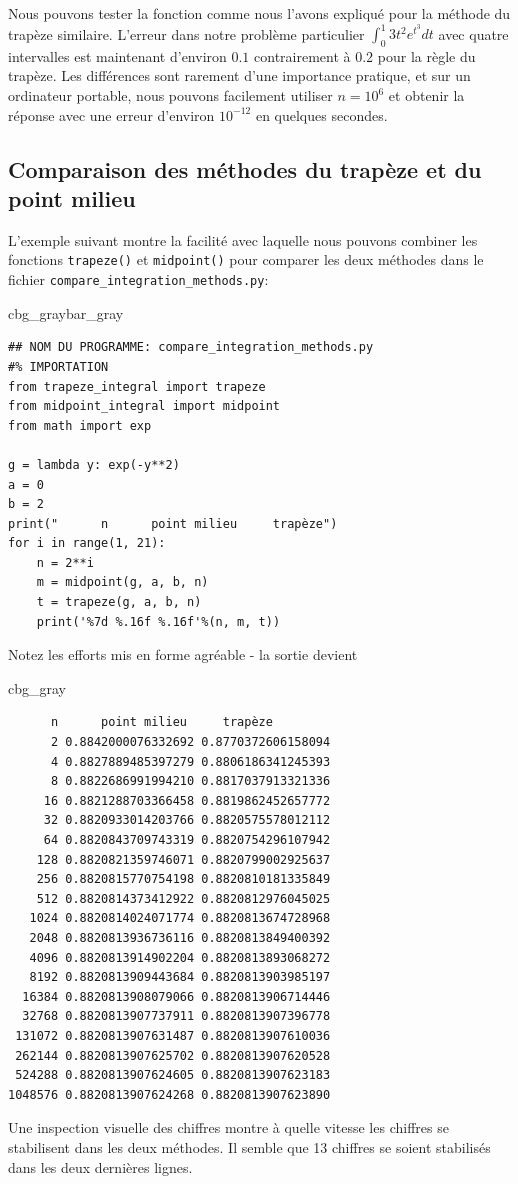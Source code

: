 \documentclass[%
oneside,                 %
final,                   %
10pt]{article}
\newenvironment{_cod_tight}[1]{
   \def\FrameCommand{\colorbox{#1}}
   \FrameRule0.6pt\MakeFramed {\FrameRestore}\vskip3mm}
   {\vskip0mm\endMakeFramed}
\newenvironment{cod}[1]{
\bgroup\rmfamily
\fboxsep=0mm\relax
\begin{_cod_tight}{#1}
\list{}{\parsep=-2mm\parskip=0mm\topsep=0pt\leftmargin=2mm
\rightmargin=2\leftmargin\leftmargin=4pt\relax}
\item\relax}
{\endlist\end{_cod_tight}\egroup}
\newenvironment{_pro_tight}[2]{
   \def\FrameCommand{\color{#2}\vrule width 1mm\normalcolor\colorbox{#1}}
   \FrameRule0.6pt\MakeFramed {\advance\hsize-2mm\FrameRestore}\vskip3mm}
   {\vskip0mm\endMakeFramed}
\newenvironment{pro}[2]{
\bgroup\rmfamily
\fboxsep=0mm\relax
\begin{_pro_tight}{#1}{#2}
\list{}{\parsep=-2mm\parskip=0mm\topsep=0pt\leftmargin=2mm
\rightmargin=2\leftmargin\leftmargin=4pt\relax}
\item\relax}
{\endlist\end{_pro_tight}\egroup}
\begin{document}
Nous pouvons tester la fonction comme nous l'avons expliqué pour la méthode du trapèze similaire. L'erreur dans notre problème particulier $\int_0^1 3t^2e^{t^3}dt$ avec quatre intervalles est maintenant d'environ $0.1$ contrairement à $0.2$ pour la règle du trapèze. Les différences sont rarement d'une importance pratique, et sur un ordinateur portable, nous pouvons facilement utiliser $n = 10^6$ et obtenir la réponse avec une erreur d'environ $10^{-12}$ en quelques secondes.
\subsection{Comparaison des méthodes du trapèze et du point milieu}
L'exemple suivant montre la facilité avec laquelle nous pouvons combiner les fonctions \texttt{trapeze()} et \texttt{midpoint()} pour comparer les deux méthodes dans le fichier \Verb!compare_integration_methods.py!:

\begin{pro}{cbg_gray}{bar_gray}\begin{verbatim}
## NOM DU PROGRAMME: compare_integration_methods.py
#% IMPORTATION
from trapeze_integral import trapeze
from midpoint_integral import midpoint
from math import exp

g = lambda y: exp(-y**2)
a = 0
b = 2
print("      n      point milieu     trapèze")
for i in range(1, 21):
    n = 2**i
    m = midpoint(g, a, b, n)
    t = trapeze(g, a, b, n)
    print('%7d %.16f %.16f'%(n, m, t))
\end{verbatim}
\end{pro}
\noindent

Notez les efforts mis en forme agréable - la sortie devient
\begin{cod}{cbg_gray}\begin{verbatim}
      n      point milieu     trapèze
      2 0.8842000076332692 0.8770372606158094
      4 0.8827889485397279 0.8806186341245393
      8 0.8822686991994210 0.8817037913321336
     16 0.8821288703366458 0.8819862452657772
     32 0.8820933014203766 0.8820575578012112
     64 0.8820843709743319 0.8820754296107942
    128 0.8820821359746071 0.8820799002925637
    256 0.8820815770754198 0.8820810181335849
    512 0.8820814373412922 0.8820812976045025
   1024 0.8820814024071774 0.8820813674728968
   2048 0.8820813936736116 0.8820813849400392
   4096 0.8820813914902204 0.8820813893068272
   8192 0.8820813909443684 0.8820813903985197
  16384 0.8820813908079066 0.8820813906714446
  32768 0.8820813907737911 0.8820813907396778
 131072 0.8820813907631487 0.8820813907610036
 262144 0.8820813907625702 0.8820813907620528
 524288 0.8820813907624605 0.8820813907623183
1048576 0.8820813907624268 0.8820813907623890
\end{verbatim}
\end{cod}
\noindent
Une inspection visuelle des chiffres montre à quelle vitesse les chiffres se stabilisent dans les deux méthodes. Il semble que 13 chiffres se soient stabilisés dans les deux dernières lignes.
\end{document}

